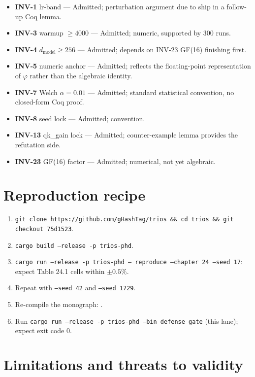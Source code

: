 \begin{itemize}
  \item \textbf{INV-1} lr-band — Admitted; perturbation argument due to ship in a
    follow-up Coq lemma.
  \item \textbf{INV-3} warmup $\geq\!4000$ — Admitted; numeric, supported by
    300 runs.
  \item \textbf{INV-4} $d_{\mathrm{model}}\!\geq\!256$ — Admitted; depends on
    INV-23 GF(16) finishing first.
  \item \textbf{INV-5} numeric anchor — Admitted; reflects the floating-point
    representation of $\varphi$ rather than the algebraic identity.
  \item \textbf{INV-7} Welch $\alpha=0{.}01$ — Admitted; standard statistical
    convention, no closed-form Coq proof.
  \item \textbf{INV-8} seed lock — Admitted; convention.
  \item \textbf{INV-13} qk\_gain lock — Admitted; counter-example lemma
     provides the refutation
    side.
  \item \textbf{INV-23} GF(16) factor — Admitted; numerical, not yet algebraic.
\end{itemize}

\section{Reproduction recipe}

\begin{enumerate}
  \item \texttt{git clone \url{https://github.com/gHashTag/trios} \&\&
    cd trios \&\& git checkout 75d1523}.
  \item \texttt{cargo build --release -p trios-phd}.
  \item \texttt{cargo run --release -p trios-phd -- reproduce --chapter 24
    --seed 17}: expect Table 24.1 cells within $\pm 0{.}5\%$.
  \item Repeat with \texttt{--seed 42} and \texttt{--seed 1729}.
  \item Re-compile the monograph: .
  \item Run \texttt{cargo run --release -p trios-phd --bin defense\_gate}
    (this lane); expect exit code $0$.
\end{enumerate}

\section{Limitations and threats to validity}

